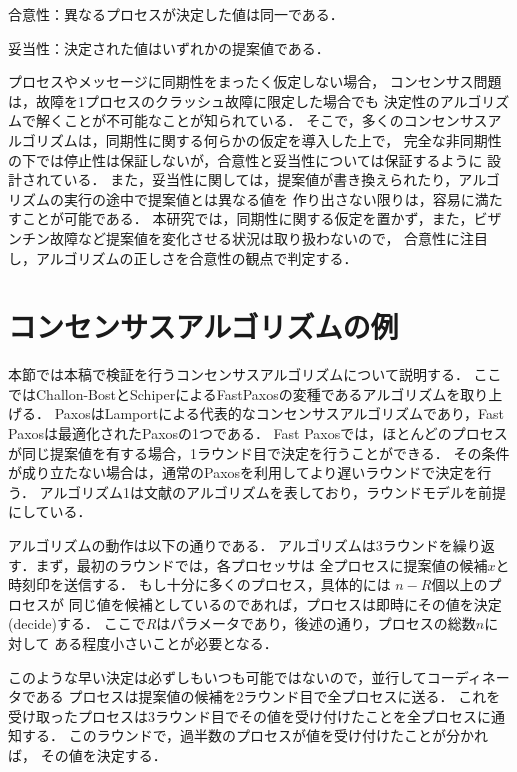 \documentclass[technicalreport]{ieicej}
\theoremstyle{plain}
\begin{document}
合意性：異なるプロセスが決定した値は同一である．

妥当性：決定された値はいずれかの提案値である．

プロセスやメッセージに同期性をまったく仮定しない場合，
コンセンサス問題は，故障を1プロセスのクラッシュ故障に限定した場合でも
決定性のアルゴリズムで解くことが不可能なことが知られている．
そこで，多くのコンセンサスアルゴリズムは，同期性に関する何らかの仮定を導入した上で，
完全な非同期性の下では停止性は保証しないが，合意性と妥当性については保証するように
設計されている．
また，妥当性に関しては，提案値が書き換えられたり，アルゴリズムの実行の途中で提案値とは異なる値を
作り出さない限りは，容易に満たすことが可能である．
本研究では，同期性に関する仮定を置かず，また，ビザンチン故障など提案値を変化させる状況は取り扱わないので，
合意性に注目し，アルゴリズムの正しさを合意性の観点で判定する．


\section{コンセンサスアルゴリズムの例}

本節では本稿で検証を行うコンセンサスアルゴリズムについて説明する．
ここではChallon-BostとSchiperによるFastPaxosの変種であるアルゴリズムを取り上げる．
PaxosはLamportによる代表的なコンセンサスアルゴリズムであり，Fast Paxosは最適化されたPaxosの1つである．
Fast Paxosでは，ほとんどのプロセスが同じ提案値を有する場合，1ラウンド目で決定を行うことができる．
その条件が成り立たない場合は，通常のPaxosを利用してより遅いラウンドで決定を行う．
アルゴリズム1は文献のアルゴリズムを表しており，ラウンドモデルを前提にしている．

アルゴリズムの動作は以下の通りである．
アルゴリズムは3ラウンドを繰り返す．まず，最初のラウンドでは，各プロセッサは
全プロセスに提案値の候補$x$と時刻印を送信する．
もし十分に多くのプロセス，具体的には $n - R$個以上のプロセスが
同じ値を候補としているのであれば，プロセスは即時にその値を決定(decide)する．
ここで$R$はパラメータであり，後述の通り，プロセスの総数$n$に対して
ある程度小さいことが必要となる．

このような早い決定は必ずしもいつも可能ではないので，並行してコーディネータである
プロセスは提案値の候補を2ラウンド目で全プロセスに送る．
これを受け取ったプロセスは3ラウンド目でその値を受け付けたことを全プロセスに通知する．
このラウンドで，過半数のプロセスが値を受け付けたことが分かれば，
その値を決定する．


\end{document}
